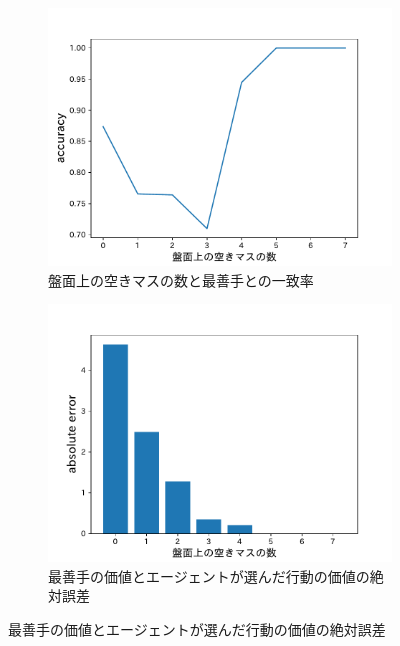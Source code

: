 \begin{figure}
    \begin{subfigure}[T]{0.5\columnwidth}
        \centering
        \includegraphics[width=\columnwidth]{figures/empty_tiles_accuracy.pdf}
        \caption{盤面上の空きマスの数と最善手との一致率}
        \label{fig:empty_tiles_accuracy}
    \end{subfigure}
    \begin{subfigure}[T]{0.5\columnwidth}
        \centering
        \includegraphics[width=\columnwidth]{figures/empty_tiles_abs_error.pdf}
        \caption{最善手の価値とエージェントが選んだ行動の価値の絶対誤差}
        \label{fig:empty_tiles_abs_error}
    \end{subfigure}
\end{figure}

